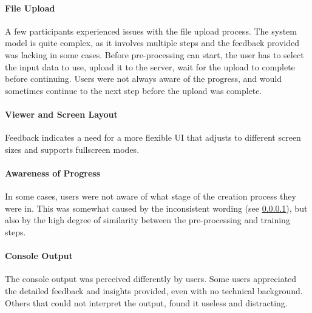 
\paragraph{File Upload}
\label{sec:results:issues:file_upload}
A few participants experienced issues with the file upload process. 
\cite{P1, P4, P6}
The system model is quite complex, as it involves multiple steps and the feedback provided was lacking in some cases.
Before pre-processing can start, the user has to select the input data to use, upload it to the server, wait for the upload to complete before continuing.
Users were not always aware of the progress, and would sometimes continue to the next step before the upload was complete. 


\paragraph{Viewer and Screen Layout}
Feedback indicates a need for a more flexible UI that adjusts to different screen sizes and supports fullscreen modes.
\cite{P10}

\paragraph{Awareness of Progress}
In some cases, users were not aware of what stage of the creation process they were in.
This was somewhat caused by the inconsistent wording (see \ref{sec:results:issues:file_upload}), but also by the high degree of similarity between the pre-processing and training steps.
\cite{P2}


\paragraph{Console Output}
The console output was perceived differently by users. 
Some users appreciated the detailed feedback and insights provided, even with no technical background. \cite{P5}
Others that could not interpret the output, found it useless and distracting. \cite{P3, P4}

